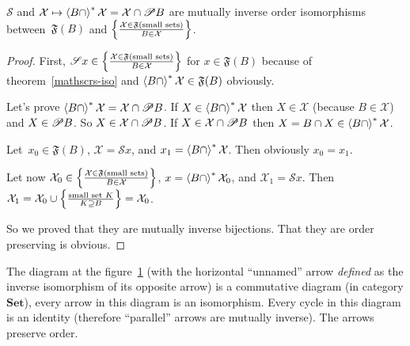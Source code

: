 \begin{lem}
$\mathscr{S}$ and
$\mathcal{X}\mapsto\left\langle B\cap\right\rangle ^{\ast}\mathcal{X}=
\mathcal{X}\cap\mathscr{P} B$
are mutually inverse order isomorphisms
between~$\mathfrak{F}(B)$ and
$\left\{ \frac{\mathcal{X}\in\mathfrak{F}(\text{small sets})}{B\in\mathcal{X}}\right\}$.
\end{lem}

\begin{proof}
First, $\mathscr{S}x\in\left\{ \frac{\mathcal{X}\in\mathfrak{F}(\text{small sets})}{B\in\mathcal{X}}\right\}$ for $x\in\mathfrak{F}(B)$
because of theorem~\ref{mathscrs-iso} and
$\left\langle B\cap\right\rangle ^{\ast}\mathcal{X}\in\mathfrak{F}(B)$ obviously.

Let's prove
$\left\langle B\cap\right\rangle ^{\ast}\mathcal{X}=\mathcal{X}\cap\mathscr{P} B$.
If $X\in\left\langle B\cap\right\rangle ^{\ast}\mathcal{X}$ then
$X\in\mathcal{X}$ (because $B\in\mathcal{X}$) and
$X\in\mathscr{P} B$. So $X\in\mathcal{X}\cap\mathscr{P} B$. If
$X\in\mathcal{X}\cap\mathscr{P} B$ then
$X=B\cap X\in\left\langle B\cap\right\rangle ^{\ast}\mathcal{X}$.

Let~$x_0\in\mathfrak{F}(B)$, $\mathcal{X}=\mathscr{S}x$, and
$x_1=\left\langle B\cap\right\rangle ^{\ast}\mathcal{X}$. Then obviously $x_0=x_1$.

Let now
$\mathcal{X}_0\in\left\{ \frac{\mathcal{X}\in\mathfrak{F}(\text{small sets})}{B\in\mathcal{X}}\right\}$, $x=\left\langle B\cap\right\rangle ^{\ast}\mathcal{X}_0$, and
$\mathcal{X}_1=\mathscr{S}x$. Then
$\mathcal{X}_1=
\mathcal{X}_0\cup\left\{ \frac{\text{small set }K}{K\supseteq B}\right\}=
\mathcal{X}_0$.

So we proved that they are mutually inverse bijections. That
they are order preserving is obvious.
\end{proof}

\begin{thm}
The diagram at the figure~\ref{unfix-dia} (with the horizontal ``unnamed''
arrow \emph{defined} as the inverse isomorphism of its opposite arrow)
is a commutative diagram (in category $\mathbf{Set}$), every arrow
in this diagram is an isomorphism. Every cycle in this diagram is
an identity (therefore ``parallel'' arrows are mutually inverse).
The arrows preserve order.

\begin{figure}[ht]
\caption{\label{unfix-dia}}

\end{figure}
\end{thm}

